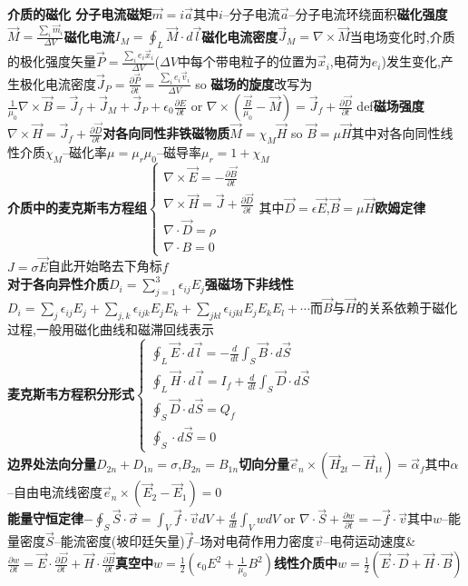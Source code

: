 \documentclass[10pt,a4paper]{article}
\begin{document}
\begin{multicols}{2}
\textbf{介质的磁化 分子电流磁矩}$\vec{m}=i\vec{a}$其中$i$--分子电流$\vec{a}$--分子电流环绕面积\textbf{磁化强度}$\vec{M}=\frac{\sum_i\vec{m}_i}{\Delta V}$\textbf{磁化电流}$I_M=\oint_L\vec{M}\cdot d\vec{l}$\textbf{磁化电流密度}$\vec{J}_M=\nabla\times\vec{M}$当电场变化时,介质的极化强度矢量$\vec{P}=\frac{\sum_ie_i\vec{x}_i}{\Delta V}$($\Delta V$中每个带电粒子的位置为$\vec{x}_i$,电荷为$e_i$)发生变化,产生极化电流密度$\vec{J}_P=\frac{\partial\vec{P}}{\partial t}=\frac{\sum_ie_i\vec{v}_i}{\Delta V}$ so \textbf{磁场的旋度}改写为$\frac{1}{\mu_0}\nabla\times\vec{B}=\vec{J}_f+\vec{J}_M+\vec{J}_P+\epsilon_0\frac{\partial E}{\partial t}$ or $\nabla\times(\frac{\vec{B}}{\mu_0}-\vec{M})=\vec{J}_f+\frac{\partial\vec{D}}{\partial t}$ def\textbf{磁场强度}$\nabla\times\vec{H}=\vec{J}_f+\frac{\partial\vec{D}}{\partial t}$\textbf{对各向同性非铁磁物质}$\vec{M}=\chi_M\vec{H}$ so $\vec{B}=\mu\vec{H}$其中对各向同性线性介质$\chi_M$--磁化率$\mu=\mu_r\mu_0$--磁导率$\mu_r=1+\chi_M$\\
\textbf{介质中的麦克斯韦方程组}$\left\{\begin{array}{l}\nabla\times\vec{E}=-\frac{\partial\vec{B}}{\partial t}\\\nabla\times\vec{H}=\vec{J}+\frac{\partial\vec{D}}{\partial t}\\\nabla\cdot\vec{D}=\rho\\\nabla\cdot{B}=0\end{array}\right.$其中$\vec{D}=\epsilon\vec{E}$,$\vec{B}=\mu\vec{H}$\textbf{欧姆定律}$J=\sigma\vec{E}$自此开始略去下角标$f$\\
\textbf{对于各向异性介质}$D_i=\sum_{j=1}^3\epsilon_{ij}E_{j}$\textbf{强磁场下非线性}$D_i=\sum_{j}\epsilon_{ij}E_j+\sum_{j,k}\epsilon_{ijk}E_jE_k+\sum_{jkl}\epsilon_{ijkl}E_jE_kE_l+\cdots$而$\vec{B}$与$\vec{H}$的关系依赖于磁化过程,一般用磁化曲线和磁滞回线表示\\
\textbf{麦克斯韦方程积分形式}$\left\{\begin{array}{l}\oint_L\vec{E}\cdot d\vec{l}=-\frac{d}{dt}\int_S\vec{B}\cdot d\vec{S}\\\oint_L\vec{H}\cdot d\vec{l}=I_f+\frac{d}{dt}\int_S\vec{D}\cdot d\vec{S}\\\oint_S\vec{D}\cdot d\vec{S}=Q_f\\\oint_S\cdot d\vec{S}=0\end{array}\right.$\\
\textbf{边界处法向分量}$D_{2n}+D_{1n}=\sigma$,$B_{2n}=B_{1n}$\textbf{切向分量}$\vec{e}_n\times(\vec{H}_{2t}-\vec{H}_{1t})=\vec{\alpha}_f$其中$\alpha$--自由电流线密度$\vec{e}_n\times(\vec{E}_2-\vec{E}_1)=0$\\
\textbf{能量守恒定律}$-\oint_S\vec{S}\cdot\vec{\sigma}=\int_V\vec{f}\cdot\vec{v}dV+\frac{d}{dt}\int_VwdV$ or $\nabla\cdot\vec{S}+\frac{\partial w}{\partial t}=-\vec{f}\cdot\vec{v}$其中$w$--能量密度$\vec{S}$--能流密度(坡印廷矢量)$\vec{f}$--场对电荷作用力密度$\vec{v}$--电荷运动速度\& $\frac{\partial w}{\partial t}=\vec{E}\cdot\frac{\partial\vec{D}}{\partial t}+\vec{H}\cdot\frac{\partial\vec{B}}{\partial t}$\textbf{真空中}$w=\frac{1}{2}(\epsilon_0E^2+\frac{1}{\mu_0}B^2)$\textbf{线性介质中}$w=\frac{1}{2}(\vec{E}\cdot\vec{D}+\vec{H}\cdot\vec{B})$
\end{multicols}
\end{document}
